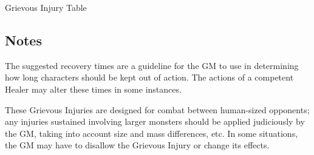 \begin{Chapter}{Grievous Injury Table}
\begin{Description}
\end{Description}

\subsection{Notes}

The suggested recovery times are a guideline for the GM to use in
determining how long characters should be kept out of action. The
actions of a competent Healer may alter these times in some instances.

These Grievous Injuries are designed for combat between human-sized
opponents; any injuries sustained involving larger monsters should be
applied judiciously by the GM, taking into account size and mass
differences, etc.  In some situations, the GM may have to disallow the
Grievous Injury or change its effects.

\end{Chapter}
